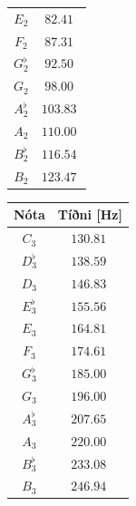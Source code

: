 \begin{table}[H]
\begin{center}
\begin{tabular}{|c|c|}
$E_2$ & $\SI{82.41}{}$ \\
$F_2$ & $\SI{87.31}{}$ \\
$G^\flat_2$ & $\SI{92.50}{}$ \\
$G_2$ & $\SI{98.00}{}$ \\
$A^\flat_2$ & $\SI{103.83}{}$ \\
$A_2$ & $\SI{110.00}{}$ \\
$B^\flat_2$ & $\SI{116.54}{}$ \\
$B_2$ & $\SI{123.47}{}$ \\
\hline
\end{tabular}
\quad
\begin{tabular}{|c|c|}
\hline
\textbf{Nóta} & \textbf{Tíðni [Hz]} \\
\hline
\hline
$C_3$ & $\SI{130.81}{}$ \\
$D^\flat_3$ & $\SI{138.59}{}$ \\
$D_3$ & $\SI{146.83}{}$ \\
$E^\flat_3$ & $\SI{155.56}{}$ \\
$E_3$ & $\SI{164.81}{}$ \\
$F_3$ & $\SI{174.61}{}$ \\
$G^\flat_3$ & $\SI{185.00}{}$ \\
$G_3$ & $\SI{196.00}{}$ \\
$A^\flat_3$ & $\SI{207.65}{}$ \\
$A_3$ & $\SI{220.00}{}$ \\
$B^\flat_3$ & $\SI{233.08}{}$ \\
$B_3$ & $\SI{246.94}{}$ \\
\hline
\end{tabular}
\label{tafla:las}
\end{center}
\end{table}

